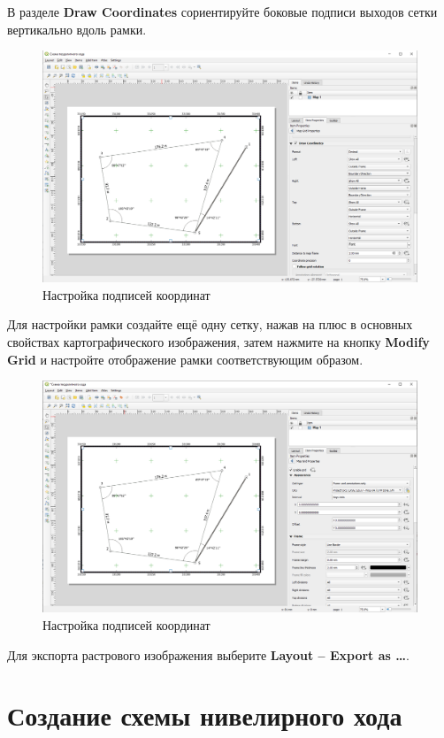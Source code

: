 \documentclass[
  12pt,
]{book}
\begin{document}
В разделе \textbf{Draw Coordinates} сориентируйте боковые подписи выходов сетки вертикально вдоль рамки.

\begin{figure}
\centering
\includegraphics{images/Practice/Coordinate_appearance.png}
\caption{Настройка подписей координат}
\end{figure}

Для настройки рамки создайте ещё одну сетку, нажав на плюс в основных свойствах картографического изображения, затем нажмите на кнопку \textbf{Modify Grid} и настройте отображение рамки соответствующим образом.

\begin{figure}
\centering
\includegraphics{images/Practice/Borders.png}
\caption{Настройка подписей координат}
\end{figure}

Для экспорта растрового изображения выберите \textbf{Layout -- Export as \ldots{}}.

\section{Создание схемы нивелирного хода}\label{ux441ux43eux437ux434ux430ux43dux438ux435-ux441ux445ux435ux43cux44b-ux43dux438ux432ux435ux43bux438ux440ux43dux43eux433ux43e-ux445ux43eux434ux430}
\end{document}
